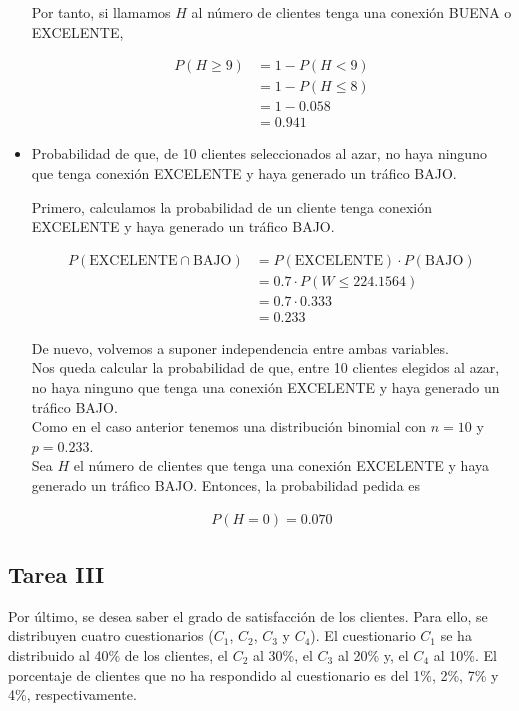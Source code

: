 \documentclass[12pt,a4paper,twoside,openright,titlepage,final]{article}
\begin{document}
\begin{itemize}
Por tanto, si llamamos $H$ al número de clientes tenga una conexión BUENA o EXCELENTE,

\begin{align*}
P(H \geq 9) &= 1 - P(H < 9) \\ &=  1 - P(H \leq 8) \\ &= 1 - 0.058 \\ &= 0.941  
\end{align*}

\item Probabilidad de que, de 10 clientes seleccionados al azar, no haya ninguno que tenga conexión EXCELENTE y haya generado un tráfico BAJO.

Primero, calculamos la probabilidad de un cliente tenga conexión EXCELENTE y haya generado un tráfico BAJO.

\begin{align*}
P(\text{EXCELENTE} \cap \text{BAJO}) &= P(\text{EXCELENTE}) \cdot P(\text{BAJO}) \\ &= 0.7 \cdot P(W \leq 224.1564) \\ &= 0.7 \cdot 0.333 \\ & = 0.233 
\end{align*} 

De nuevo, volvemos a suponer independencia entre ambas variables.\\

Nos queda calcular la probabilidad de que, entre 10 clientes elegidos al azar, no haya ninguno que tenga una conexión EXCELENTE y haya generado un tráfico BAJO.\\

Como en el caso anterior tenemos una distribución binomial con $n = 10$ y $p = 0.233$.\\

Sea $H$ el número de clientes que tenga una conexión EXCELENTE y haya generado un tráfico BAJO. Entonces, la probabilidad pedida es

\begin{align*}
P(H = 0) = 0.070
\end{align*}   
\end{itemize}

\subsection{Tarea III}

Por último, se desea saber el grado de satisfacción de los clientes. Para ello, se distribuyen cuatro cuestionarios ($C_1$, $C_2$, $C_3$ y $C_4$). El cuestionario $C_1$ se ha distribuido al 40\% de los clientes, el $C_2$ al 30\%, el $C_3$ al 20\% y, el $C_4$ al 10\%. El porcentaje de clientes que no ha respondido al cuestionario es del 1\%, 2\%, 7\% y 4\%, respectivamente.\\
\end{document}
